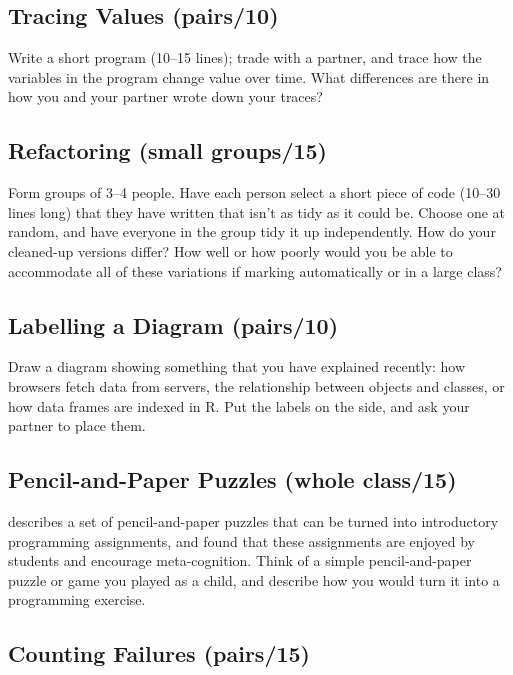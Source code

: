 \subsection{Tracing Values (pairs/10)}\label{tracing-values-pairs10}

Write a short program (10--15 lines); trade with a partner, and trace how
the variables in the program change value over time. What differences
are there in how you and your partner wrote down your traces?

\subsection{Refactoring (small groups/15)}\label{refactoring-small-groups15}

Form groups of 3--4 people. Have each person select a short piece of code
(10--30 lines long) that they have written that isn't as tidy as it could
be. Choose one at random, and have everyone in the group tidy it up
independently. How do your cleaned-up versions differ? How well or how
poorly would you be able to accommodate all of these variations if
marking automatically or in a large class?

\subsection{Labelling a Diagram (pairs/10)}\label{labelling-a-diagram-pairs10}

Draw a diagram showing something that you have explained recently: how
browsers fetch data from servers, the relationship between objects and
classes, or how data frames are indexed in R. Put the labels on the
side, and ask your partner to place them.

\subsection{Pencil-and-Paper Puzzles (whole class/15)}\label{pencil-and-paper-puzzles-whole-class15}

\cite{Butl2017} describes a set of pencil-and-paper puzzles that can
be turned into introductory programming assignments, and found that
these assignments are enjoyed by students and encourage meta-cognition.
Think of a simple pencil-and-paper puzzle or game you played as a child,
and describe how you would turn it into a programming exercise.

\subsection{Counting Failures (pairs/15)}\label{counting-failures-pairs15}

